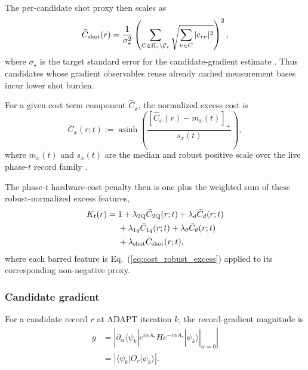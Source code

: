 \documentclass[
  reprint,
  amsmath,
  amssymb,
  aps,
  pra,
  nofootinbib,
  superscriptaddress,
  floatfix
]{revtex4-2}
\newcommand{\twq}{\mathrm{2Q}}
\begin{document}
The per-candidate shot proxy then scales as
\begin{equation}
\widehat C_{\rm shot}(r)=
\frac{1}{\sigma_\star^2}
\left(
\sum_{C\in\Pi_r\setminus\mathcal C_r}
\sqrt{\sum_{\nu\in C}|c_{r\nu}|^2}
\right)^2,
\label{eq:shot_cost_proxy}
\end{equation}
where $\sigma_\star$ is the target standard error for the candidate-gradient estimate \cite{Ikhtiarudin2025ShotEfficient}. Thus candidates whose gradient observables reuse already cached measurement bases incur lower shot burden.


For a given cost term component $\widehat C_x$, the normalized excess cost is
\begin{equation}
\bar C_x(r;t):=
\operatorname{asinh}
\left(
\frac{[\widehat C_x(r)-m_x(t)]_+}{s_x(t)}
\right),
\label{eq:cost_robust_excess}
\end{equation}
where $m_x(t)$ and $s_x(t)$ are the median and robust positive scale over the live phase-$t$ record family \cite{IglewiczHoaglin1993,Burbidge1988IHS}.

The phase-$t$ hardware-cost penalty then is one plus the weighted sum of these robust-normalized excess features,
\begin{equation}
\begin{aligned}
K_t(r)
={}&
1+\lambda_{\twq}\bar C_{\twq}(r;t)
+\lambda_d \bar C_d(r;t)\\
&+\lambda_{1q}\bar C_{1q}(r;t)
 +\lambda_\theta \bar C_\theta(r;t)\\
&+\lambda_{\rm shot}\bar C_{\rm shot}(r;t),
\end{aligned}
\label{eq:hardware_cost_sum}
\end{equation}
where each barred feature is Eq.~(\ref{eq:cost_robust_excess}) applied to its corresponding non-negative proxy.

\subsubsection{Candidate gradient}

For a candidate record $r$ at ADAPT iteration $k$, the record-gradient magnitude is
\begin{equation}
\begin{aligned}
g
&=
\left|
\left.
\partial_\alpha
\langle\psi_k|
e^{i\alpha\widetilde A_r}
H
e^{-i\alpha\widetilde A_r}
|\psi_k\rangle
\right|_{\alpha=0}
\right|\\
&=
\left|\langle\psi_k|O_r|\psi_k\rangle\right| .
\end{aligned}
\label{eq:record_gradient}
\end{equation}
\end{document}
